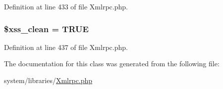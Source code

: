 Definition at line 433 of file Xmlrpc.\-php.

\hypertarget{class_x_m_l___r_p_c___response_a0f2ee8861c0b3164a5c6e126dd98c0cc}{
\subsubsection[{\$xss\-\_\-clean}]{\setlength{\rightskip}{0pt plus 5cm}\$xss\-\_\-clean = T\-R\-U\-E}}\label{class_x_m_l___r_p_c___response_a0f2ee8861c0b3164a5c6e126dd98c0cc}


Definition at line 437 of file Xmlrpc.\-php.



The documentation for this class was generated from the following file\-:\begin{DoxyCompactItemize}
\item 
system/libraries/\hyperlink{_xmlrpc_8php}{Xmlrpc.\-php}\end{DoxyCompactItemize}
